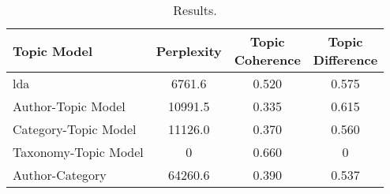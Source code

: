 \begin{table}[h]
	\centering
	\caption{Results.}
	\begin{tabular}{l|c|c|c}
		Topic Model & Perplexity & \makecell{Topic \\ Coherence} & \makecell{Topic \\ Difference} \\
		\midrule
		\Acrlong{lda} & 6761.6 & 0.520 & 0.575 \\
		Author-Topic Model & 10991.5 & 0.335 & 0.615 \\
		Category-Topic Model & 11126.0 & 0.370 & 0.560 \\
		Taxonomy-Topic Model & 0 & 0.660 & 0 \\
		Author-Category & 64260.6 & 0.390 & 0.537 \\
	\end{tabular}
	\label{tab:metric_results}
\end{table}